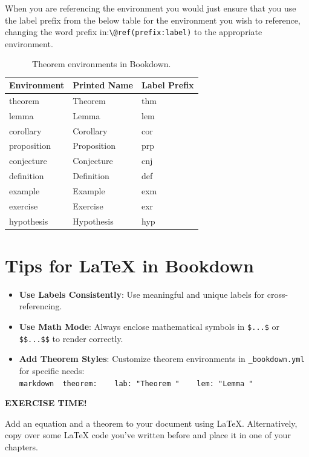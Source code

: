 \documentclass[
]{book}
\providecommand{\tightlist}{%
  \setlength{\itemsep}{0pt}\setlength{\parskip}{0pt}}
\newenvironment{blackbox}{
  \definecolor{shadecolor}{rgb}{0, 0, 0}  %
  \color{white}
  \begin{shaded}}
 {\end{shaded}}
\theoremstyle{definition}
\theoremstyle{definition}
\theoremstyle{definition}
\theoremstyle{definition}
\theoremstyle{remark}
\begin{document}
When you are referencing the environment you would just ensure that you use the label prefix from the below table for the environment you wish to reference, changing the word prefix in:\texttt{\textbackslash{}@ref(prefix:label)} to the appropriate environment.

\begin{table}

\caption{\label{tab:theorem-table}Theorem environments in Bookdown.}
\centering
\begin{tabular}[t]{lll}
\toprule
Environment & Printed Name & Label Prefix\\
\midrule
theorem & Theorem & thm\\
lemma & Lemma & lem\\
corollary & Corollary & cor\\
proposition & Proposition & prp\\
conjecture & Conjecture & cnj\\
\addlinespace
definition & Definition & def\\
example & Example & exm\\
exercise & Exercise & exr\\
hypothesis & Hypothesis & hyp\\
\bottomrule
\end{tabular}
\end{table}

\section{Tips for LaTeX in Bookdown}\label{tips-for-latex-in-bookdown}

\begin{itemize}
\tightlist
\item
  \textbf{Use Labels Consistently}: Use meaningful and unique labels for cross-referencing.
\item
  \textbf{Use Math Mode}: Always enclose mathematical symbols in \texttt{\$...\$} or \texttt{\$\$...\$\$} to render correctly.
\item
  \textbf{Add Theorem Styles}: Customize theorem environments in \texttt{\_bookdown.yml} for specific needs:
  \texttt{markdown\ \ theorem:\ \ \ \ lab:\ "Theorem\ "\ \ \ \ lem:\ "Lemma\ "}
\end{itemize}

\begin{blackbox}

\begin{center}
\textbf{EXERCISE TIME!}

\end{center}

Add an equation and a theorem to your document using LaTeX. Alternatively, copy over some LaTeX code you've written before and place it in one of your chapters.

\end{blackbox}
\end{document}
